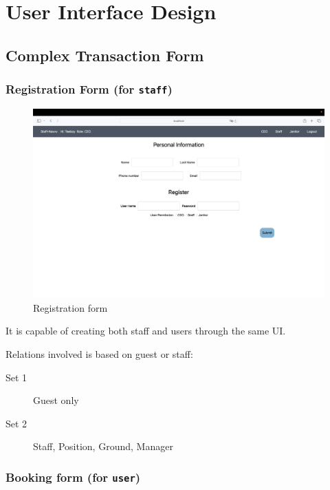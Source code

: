 \chapter{User Interface Design}

\section{Complex Transaction Form}

\subsection{Registration Form (for \texttt{staff})}

\begin{figure}[h]
	\centerline
	{\includegraphics[width=12cm]{fig/2_register}}
	\caption{Registration form}
\end{figure} 

It is capable of creating both staff and users through the same UI. 

Relations involved is based on guest or staff:

\begin{description}
	\item[Set 1] Guest only
	\item[Set 2] Staff, Position, Ground, Manager
\end{description}

\subsection{Booking form (for \texttt{user})}

